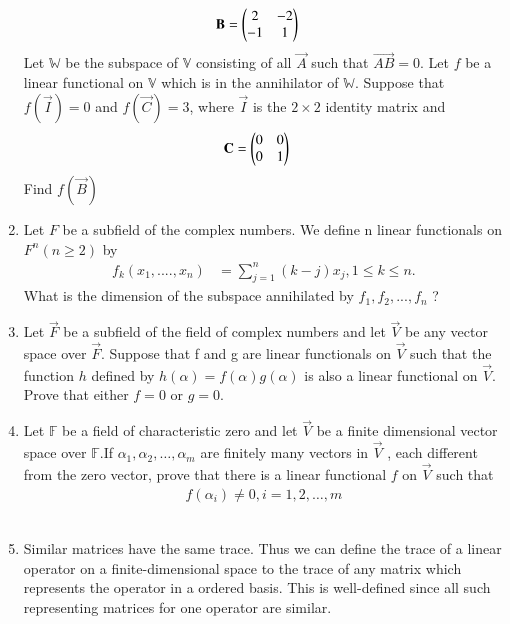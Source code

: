 \begin{enumerate}[label=\thesubsection.\arabic*.,ref=\thesubsection.\theenumi]
\begin{align}
\mathbf{B} &= \begin{pmatrix}2&-2\\-1&1\end{pmatrix}
\end{align}
Let $\mathbb{W}$ be the subspace of $\mathbb{V}$ consisting of all $\vec{A}$ such that $\vec{AB} = 0$. Let $f$ be a linear functional on $\mathbb{V}$ which is in the annihilator of $\mathbb{W}$. Suppose that $f(\vec{I}) = 0$ and $f(\vec{C}) = 3$, where $\vec{I}$ is the $2 \times 2$ identity matrix and
\begin{align}
\mathbf{C} &= \begin{pmatrix}0&0\\0&1\end{pmatrix}
\end{align}
Find $f(\vec{B})$
%
\\
\solution

\item Let $F$ be a subfield of the complex numbers. We define n linear functionals on $F^n(n \ge 2)$ by
\begin{align}
    f_k(x_1,....,x_n) &= \sum_{j=1}^{n}(k-j)x_j, 
    1 \le k \le n.
\end{align}
What is the dimension of the subspace annihilated by $f_1,f_2,...,f_n$ ?
%
\\
\solution

\item Let $\vec{F}$ be a subfield of the field of complex numbers and let $\vec{V}$ be any vector space over $\vec{F}$. Suppose that f and g are linear functionals on $\vec{V}$ such that the function $h$ defined by $h(\alpha) =f(\alpha) g(\alpha)$ is also a linear functional on $\vec{V}$. Prove that either $f=0$ or $g=0$.
%
\\
\solution

\item Let $\mathbb{F}$ be a field of characteristic zero and let $\vec{V}$ be a finite dimensional vector space over  $\mathbb{F}$.If $\alpha_1,\alpha_2,\hdots,\alpha_m$ are finitely many vectors in $\vec{V}$ , each different from the zero vector, prove that there is a linear functional $f$ on $\vec{V}$ such that
\begin{align}
    f(\alpha_i) \neq 0, i=1,2,\hdots,m
\end{align}
%
\\
\solution

\item Similar matrices have the same trace. Thus we can define the trace of a linear operator on a finite-dimensional space to the trace of any matrix which represents the operator in a ordered basis. This is well-defined since all such representing matrices for one operator are similar. 


\end{enumerate}
